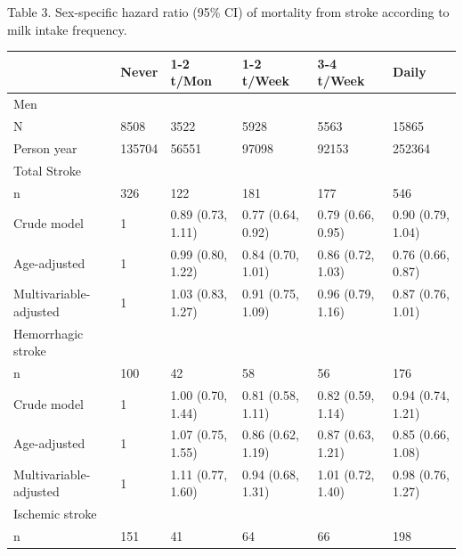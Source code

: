 \documentclass[]{tufte-handout}
\begin{document}
\begin{table}[!h]
Table 3. Sex-specific hazard ratio (95\% CI) of mortality from stroke according to milk intake frequency.

\centering
\fontsize{9}{11}\selectfont
\begin{tabular}[t]{llllll}
\toprule
 & Never & 1-2 t/Mon & 1-2 t/Week & 3-4 t/Week & Daily\\
\midrule
\rowcolor{gray!6}  Men &  &  &  &  & \\
N & 8508 & 3522 & 5928 & 5563 & 15865\\
\rowcolor{gray!6}  Person year & 135704 & 56551 & 97098 & 92153 & 252364\\
Total Stroke &  &  &  &  \vphantom{1} & \\
\rowcolor{gray!6}  \hspace{1em}n & 326 & 122 & 181 & 177 & 546\\
\hspace{1em}Crude model & 1 & 0.89 (0.73, 1.11) & 0.77 (0.64, 0.92) & 0.79 (0.66, 0.95) & 0.90 (0.79, 1.04)\\
\rowcolor{gray!6}  \hspace{1em}Age-adjusted & 1 & 0.99 (0.80, 1.22) & 0.84 (0.70, 1.01) & 0.86 (0.72, 1.03) & 0.76 (0.66, 0.87)\\
\hspace{1em}Multivariable-adjusted & 1 & 1.03 (0.83, 1.27) & 0.91 (0.75, 1.09) & 0.96 (0.79, 1.16) & 0.87 (0.76, 1.01)\\
\rowcolor{gray!6}  Hemorrhagic stroke &  &  &  &  \vphantom{1} & \\
\hspace{1em}n & 100 & 42 & 58 & 56 & 176\\
\rowcolor{gray!6}  \hspace{1em}Crude model & 1 & 1.00 (0.70, 1.44) & 0.81 (0.58, 1.11) & 0.82 (0.59, 1.14) & 0.94 (0.74, 1.21)\\
\hspace{1em}Age-adjusted & 1 & 1.07 (0.75, 1.55) & 0.86 (0.62, 1.19) & 0.87 (0.63, 1.21) & 0.85 (0.66, 1.08)\\
\rowcolor{gray!6}  \hspace{1em}Multivariable-adjusted & 1 & 1.11 (0.77, 1.60) & 0.94 (0.68, 1.31) & 1.01 (0.72, 1.40) & 0.98 (0.76, 1.27)\\
Ischemic stroke &  &  &  &  \vphantom{1} & \\
\rowcolor{gray!6}  \hspace{1em}n & 151 & 41 & 64 & 66 & 198\\

\end{tabular}
\end{table}
\end{document}
